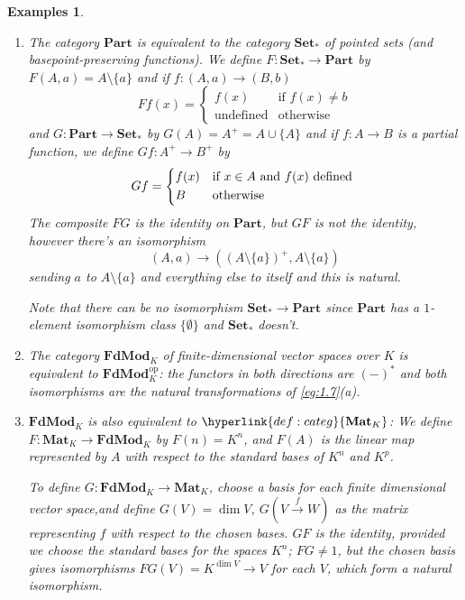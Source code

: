 \documentclass{article}
\let\to\longrightarrow
\newtheorem{nexample}[nthm]{Examples}
\begin{document}
\begin{nexample}\label{eg:1.10}\leavevmode
  \begin{enumerate}[label=(\alph*)]
    \item The category \hyperlink{def:categ}{$\mathbf{Part}$} is equivalent to the category $\mathbf{Set}_*$ of pointed sets (and basepoint-preserving functions).
      We define $F: \mathbf{Set}_* \to \mathbf{Part}$ by $F(A,a) = A \setminus \{a\}$ and if $f: (A,a) \to (B,b)$
      \begin{equation*}
        Ff(x) =
        \begin{cases}
          f(x) & \text{if } f(x) \neq b \\
          \text{undefined} & \text{otherwise}
        \end{cases}
      \end{equation*}
      and
      $G : \mathbf{Part} \to \mathbf{Set}_*$ by $G(A) = A^+ = A \cup \{A\}$ and if $f: A \to B$ is a partial function, we define $Gf: A^+ \to B^+$ by
      \begin{equation*}
        Gf =
        \begin{cases*}
          f(x) & if $x \in A$ and $f(x)$ defined \\
          B & otherwise
        \end{cases*}
      \end{equation*}
      The composite $FG$ is the identity on $\mathbf{Part}$, but $GF$ is not the identity, however there's an isomorphism
      \begin{equation*}
        (A,a) \to ((A \setminus \{a\})^+, A \setminus \{a\})
      \end{equation*}
      sending $a$ to $A \setminus \{a\}$ and everything else to itself and this is natural.

      Note that there can be no isomorphism $\mathbf{Set}_* \to \mathbf{Part}$ since $\mathbf{Part}$ has a $1$-element isomorphism class $\{\emptyset\}$ and $\mathbf{Set}_*$ doesn't.
    \item The category $\mathbf{FdMod}_K$ of finite-dimensional vector spaces over $K$ is equivalent to $\mathbf{FdMod}_K^\text{op}$: the functors in both directions are $(-)^*$ and both isomorphisms are the natural transformations of \cref{eg:1.7}(a).
    \item $\mathbf{FdMod}_K$ is also equivalent to $\hyperlink{def:categ}{\mathbf{Mat}_K}$: We define $F: \mathbf{Mat}_K \to \mathbf{FdMod}_K$ by $F(n) = K^n$, and $F(A)$ is the linear map represented by $A$ with respect to the standard bases of $K^n$ and $K^p$.

      To define $G: \mathbf{FdMod}_K \to \mathbf{Mat}_K$, choose a basis for each finite dimensional vector space,and define $G(V) = \dim V$, $G(V \overset{f}{\to} W)$ as the matrix representing $f$ with respect to the chosen bases.
      $GF$ is the identity, provided we choose the standard bases for the spaces $K^n$; $FG \neq 1$, but the chosen basis gives isomorphisms $FG(V) = K^{\dim V} \to V$ for each $V$, which form a natural isomorphism.
  \end{enumerate}
\end{nexample}
\end{document}
